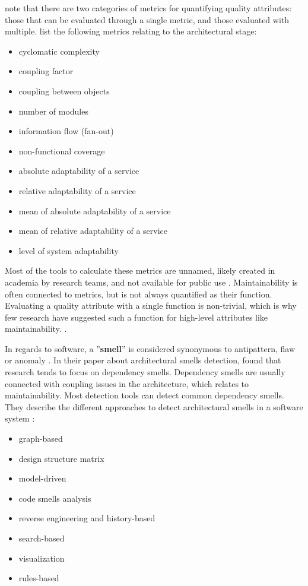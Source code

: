 \documentclass[utf8,english]{gradu3}
\begin{document}
\textcite[63]{Arvanitou2017} note that there are two categories of metrics for
quantifying quality attributes: those that can be evaluated through a single
metric, and those evaluated with multiple. \textcite[66]{Arvanitou2017} list the
following metrics relating to the architectural stage:
\begin{itemize}
  \item cyclomatic complexity
  \item coupling factor
  \item coupling between objects
  \item number of modules
  \item information flow (fan-out)
  \item non-functional coverage
  \item absolute adaptability of a service
  \item relative adaptability of a service
  \item mean of absolute adaptability of a service
  \item mean of relative adaptability of a service
  \item level of system adaptability
\end{itemize}

Most of the tools to calculate these metrics are unnamed, likely created in
academia by research teams, and not available for public use \parencite{Arvanitou2017}. Maintainability is often connected to metrics, but is not always quantified
as their function. Evaluating a quality attribute with a single function is
non-trivial, which is why few research have suggested such a function for
high-level attributes like maintainability. \parencite[67]{Arvanitou2017}.

In regards to software, a ''\textbf{smell}'' is considered synonymous to antipattern,
flaw or anomaly \parencite[1]{Mumtaz2021}. In their paper about architectural
smells detection, \textcite[20]{Mumtaz2021} found that research tends to focus on
dependency smells. Dependency smells are usually connected with coupling issues
in the architecture, which relates to maintainability. Most detection tools can
detect common dependency smells. They describe the different approaches to detect
architectural smells in a software system \parencite[8-14]{Mumtaz2021}:
\begin{itemize}
  \item  graph-based
  \item design structure matrix
  \item model-driven
  \item code smells analysis
  \item reverse engineering and history-based
  \item search-based
  \item visualization
  \item rules-based
\end{itemize}
\end{document}
